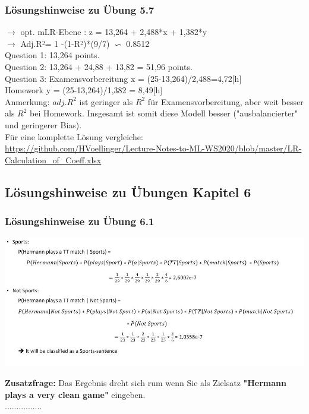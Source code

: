 \documentclass[12pt]{article}
\begin{document}
\subsubsection{Lösungshinweise zu Übung 5.7}
%
$\rightarrow$ opt. mLR-Ebene :  z = 13,264 +  2,488*x +  1,382*y \\[0.2cm]				
$\rightarrow$ Adj.R²=  1 -(1-R²)*(9/7) $\backsim $ 0.8512  \\[0.3cm]				
Question 1:  13,264 points.	\\[0.1cm]
Question 2:  13,264 + 24,88 + 13,82 = 51,96 points.\\[0.1cm]
Question 3:  Examensvorbereitung x = (25-13,264)/2,488=4,72[h]\\ Homework y = (25-13,264)/1,382 = 8,49[h]\\[0.2cm]
Anmerkung: $adj.R^2$ ist geringer als $R^2$ für Examensvorbereitung, aber weit besser als $R^2$ bei Homework. Insgesamt ist somit diese Modell besser ("ausbalancierter" und geringerer Bias). \\[0.3cm]
	
\hspace*{1.0cm}Für eine komplette Lösung vergleiche:\\
\url{https://github.com/HVoellinger/Lecture-Notes-to-ML-WS2020/blob/master/LR-Calculation_of_Coeff.xlsx}\\[0.4cm]	


\newpage

\subsection{Lösungshinweise zu Übungen Kapitel 6}

\subsubsection{Lösungshinweise zu Übung 6.1}

\begin{center} 
\includegraphics[width=1.1\textwidth]{Naive-Bayes-Ueb61_Hinweis}
\end{center}
\textbf{Zusatzfrage:} Das Ergebnis dreht sich rum wenn Sie als Zielsatz \textbf{"Hermann plays a very clean game"} eingeben.\\................
\end{document}
